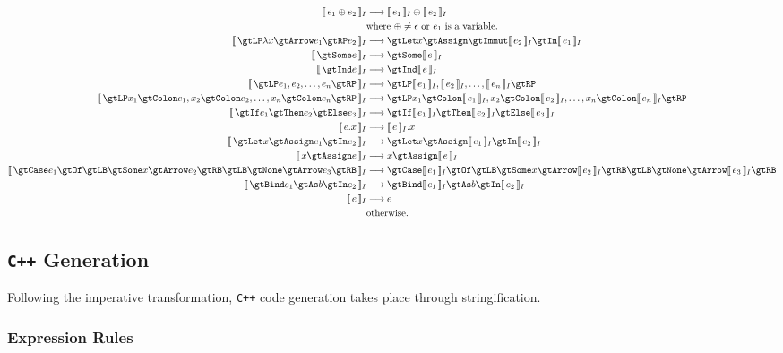 \documentclass{article}
\begin{document}
    \begin{adjustwidth}{-0.5in}{-0.5in}\begin{align*}
        \eqI{e_1 \oplus e_2}{\intI{e_1} \oplus \intI{e_2}}{where $\oplus \neq \epsilon$ or $e_1$ is a variable.} \\
        \eqI{\gtLP \lambda x \gtArrow e_1 \gtRP e_2}{\gtLet x \gtAssign \gtImmut \intI{e_2} \gtIn \intI{e_1}}{} \\
        \eqI{\gtSome e}{\gtSome \intI{e}}{} \\
        \eqI{\gtInd e}{\gtInd \intI{e}}{} \\
        \eqI{\gtLP e_1, e_2, \ldots, e_n \gtRP}{\gtLP \intI{e_1}, \intI{e_2}, \ldots, \intI{e_n} \gtRP}{} \\
        \eqI{\gtLP x_1 \gtColon e_1, x_2 \gtColon e_2, \ldots, x_n \gtColon e_n \gtRP}
            {\gtLP x_1 \gtColon \intI{e_1}, x_2 \gtColon \intI{e_2}, \ldots, x_n \gtColon \intI{e_n} \gtRP}{} \\
        \eqI{\gtIf e_1 \gtThen e_2 \gtElse e_3}{\gtIf \intI{e_1} \gtThen \intI{e_2} \gtElse \intI{e_3}}{} \\
        \eqI{e.x}{\intI{e}.x}{} \\
        \eqI{\gtLet x \gtAssign e_1 \gtIn e_2}{\gtLet x \gtAssign \intI{e_1} \gtIn \intI{e_2}}{} \\
        \eqI{x \gtAssign e}{x \gtAssign \intI{e}}{} \\
        \eqI{\gtCase e_1 \gtOf \gtLB \gtSome x \gtArrow e_2 \gtRB
                \gtLB \gtNone \gtArrow e_3 \gtRB}
            {\gtCase \intI{e_1} \gtOf \gtLB \gtSome x \gtArrow \intI{e_2} \gtRB
                \gtLB \gtNone \gtArrow \intI{e_3} \gtRB}
            {} \\
        \eqI{\gtBind e_1 \gtAs b \gtIn e_2}{\gtBind \intI{e_1} \gtAs b \gtIn \intI{e_2}}{} \\
        \eqI{e}{e}{otherwise.}
    \end{align*}\end{adjustwidth}

    \subsection{\texttt{C++} Generation}

    Following the imperative transformation, \texttt{C++} code generation takes place through
    stringification.

    \subsubsection{Expression Rules}
\end{document}
